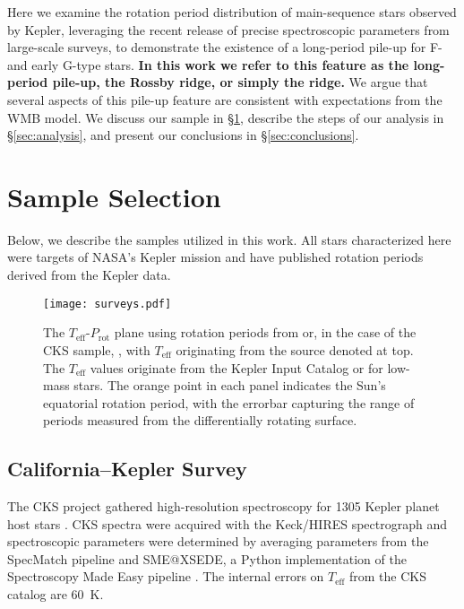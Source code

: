\documentclass[twocolumn]{aastex631}
\newcommand{\teff}{\ensuremath{T_{\mathrm{eff}}}\xspace}
\newcommand{\prot}{\ensuremath{P_\mathrm{rot}}\xspace}
\begin{document}
Here we examine the rotation period distribution of main-sequence stars observed by Kepler, leveraging the recent release of precise spectroscopic parameters from large-scale surveys, to demonstrate the existence of a long-period pile-up for F- and early G-type stars. \textbf{In this work we refer to this feature as the long-period pile-up, the Rossby ridge, or simply the ridge.} We argue that several aspects of this pile-up feature are consistent with expectations from the WMB model. We discuss our sample in \S\ref{sec:sample}, describe the steps of our analysis in \S\ref{sec:analysis}, and present our conclusions in \S\ref{sec:conclusions}.

\section{Sample Selection} \label{sec:sample}
Below, we describe the samples utilized in this work. All stars characterized here were targets of NASA's Kepler mission \citep{Borucki2010} and have published rotation periods derived from the Kepler data.


\begin{figure*}
    \centering
    \texttt{[image: surveys.pdf]}
    \caption{The \teff-\prot plane using rotation periods from \citet{McQuillan2014} or, in the case of the CKS sample, \citet{McQuillan2013}, with \teff originating from the source denoted at top. The \citet{McQuillan2014} \teff values originate from the Kepler Input Catalog \citep[KIC,][]{Brown2011} or \citet{Dressing2013} for low-mass stars. The orange point in each panel indicates the Sun's equatorial rotation period, with the errorbar capturing the range of periods measured from the differentially rotating surface.}
    \label{fig:surveys}
\end{figure*}

\subsection{California--Kepler Survey} \label{sec:cks}
The CKS project gathered high-resolution spectroscopy for 1305 Kepler planet host stars \citep{Petigura2017}. CKS spectra were acquired with the Keck/HIRES spectrograph \citep{Vogt1994} and spectroscopic parameters were determined by averaging parameters from the SpecMatch pipeline \citep{Petigura2015} and SME@XSEDE, a Python implementation of the Spectroscopy Made Easy pipeline \citep{Valenti1996}. The internal errors on \teff from the CKS catalog are 60~K.
\end{document}

